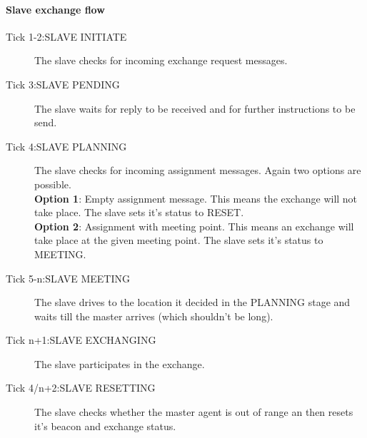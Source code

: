 \documentclass[../main.tex]{subfiles}
\begin{document}
\paragraph{Slave exchange flow}
\begin{description}
	\item[Tick 1-2:SLAVE INITIATE]
	The slave checks for incoming exchange request messages.
	\item[Tick 3:SLAVE PENDING]
	The slave waits for reply to be received and for further instructions to be send.
	\item[Tick 4:SLAVE PLANNING]
	The slave checks for incoming assignment messages.
	Again two options are possible.
	\\
	\textbf{Option 1}: Empty assignment message.
	This means the exchange will not take place.
	The slave sets it's status to RESET.
	\\
	\textbf{Option 2}: Assignment with meeting point.
	This means an exchange will take place at the given meeting point.
	The slave sets it's status to MEETING.
	\item[Tick 5-n:SLAVE MEETING]
	The slave drives to the location it decided in the PLANNING stage and waits till the master arrives (which shouldn't be long).
	\item[Tick n+1:SLAVE EXCHANGING] 
	The slave participates in the exchange.
	\item[Tick 4/n+2:SLAVE RESETTING]
	The slave checks whether the master agent is out of range an then resets it's beacon and exchange status.
\end{description}
\end{document}
